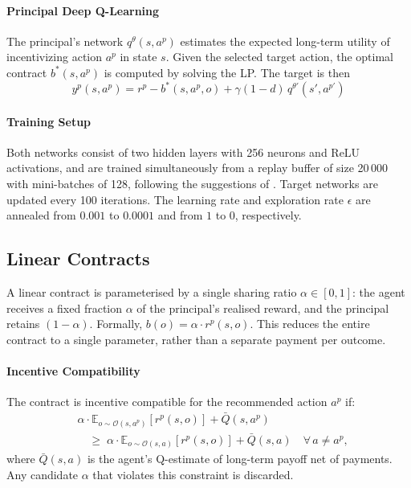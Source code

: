 \documentclass{article}
\theoremstyle{plain}
\theoremstyle{definition}
\theoremstyle{remark}
\begin{document}
\paragraph{Principal Deep Q-Learning}
The principal's network $q^{\theta}(s,a^p)$ estimates the expected long-term utility of incentivizing action $a^p$ in state $s$. Given the selected target action, the optimal contract $b^*(s,a^p)$ is computed 
by solving the LP.
The target is then
\[
y^{p}(s,a^{p}) = r^{p} - b^{*}(s,a^{p},o)
+ \gamma(1-d)\,q^{\theta'}(s',a^{p'})
\]

\paragraph{Training Setup}
Both networks consist of two hidden layers with 256 neurons and ReLU activations, and are trained simultaneously from a replay buffer of size 20\,000 with mini-batches of 128, following the suggestions of \cite{ivanov2024principal}.
Target networks are updated every 100 iterations. The learning rate and exploration rate $\epsilon$ are annealed from $0.001$ to $0.0001$ and from $1$ to $0$, respectively.

\subsection{Linear Contracts}
\label{subsec:linear_contracts}

A linear contract is parameterised by a single sharing ratio $\alpha \in [0,1]$: the agent receives a fixed fraction $\alpha$ of the principal’s realised reward, and the principal retains $(1-\alpha)$. Formally, $b(o) = \alpha \cdot r^p(s, o)$. This reduces the entire contract to a single parameter, rather than a separate payment per outcome.

\paragraph{Incentive Compatibility}
The contract is incentive compatible for the recommended action $a^p$ if:
\[
\begin{aligned}
  &\alpha \cdot \mathbb{E}_{o \sim \mathcal{O}(s,a^p)}[r^p(s,o)] + \bar{Q}(s,a^p) \\
  &\quad \geq\; \alpha \cdot \mathbb{E}_{o \sim \mathcal{O}(s,a)}[r^p(s,o)] + \bar{Q}(s,a)
  \quad \forall\, a \neq a^p,
\end{aligned}
\]
where $\bar{Q}(s,a)$ is the agent’s Q-estimate of long-term payoff net of payments. Any candidate $\alpha$ that violates this constraint is discarded.
\end{document}
